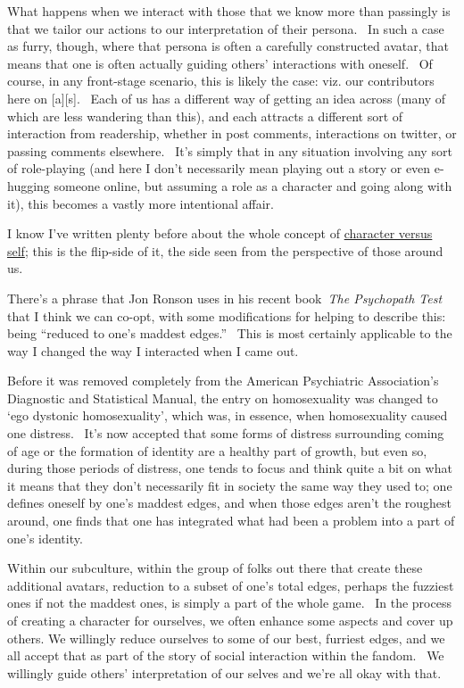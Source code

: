 What happens when we interact with those that we know more than
passingly is that we tailor our actions to our interpretation of their
persona. ~In such a case as furry, though, where that persona is often a
carefully constructed avatar, that means that one is often actually
guiding others' interactions with oneself. ~Of course, in any
front-stage scenario, this is likely the case: viz. our contributors
here on {[}a{]}{[}s{]}. ~Each of us has a different way of getting an
idea across (many of which are less wandering than this), and each
attracts a different sort of interaction from readership, whether in
post comments, interactions on twitter, or passing comments elsewhere.
~It's simply that in any situation involving any sort of role-playing
(and here I don't necessarily mean playing out a story or even e-hugging
someone online, but assuming a role as a character and going along with
it), this becomes a vastly more intentional affair.

I know I've written plenty before about the whole concept of
\href{http://adjectivespecies.com/2011/11/23/character-versus-self/}{character
versus self}; this is the flip-side of it, the side seen from the
perspective of those around us.

There's a phrase that Jon Ronson uses in his recent book~\emph{The
Psychopath Test} that I think we can co-opt, with some modifications for
helping to describe this: being ``reduced to one's maddest edges.''
~This is most certainly applicable to the way I changed the way I
interacted when I came out.

Before it was removed completely from the American Psychiatric
Association's Diagnostic and Statistical Manual, the entry on
homosexuality was changed to `ego dystonic homosexuality', which was, in
essence, when homosexuality caused one distress. ~It's now accepted that
some forms of distress surrounding coming of age or the formation of
identity are a healthy part of growth, but even so, during those periods
of distress, one tends to focus and think quite a bit on what it means
that they don't necessarily fit in society the same way they used to;
one defines oneself by one's maddest edges, and when those edges aren't
the roughest around, one finds that one has integrated what had been a
problem into a part of one's identity.

Within our subculture, within the group of folks out there that create
these additional avatars, reduction to a subset of one's total edges,
perhaps the fuzziest ones if not the maddest ones, is simply a part of
the whole game. ~In the process of creating a character for ourselves,
we often enhance some aspects and cover up others. We willingly reduce
ourselves to some of our best, furriest edges, and we all accept that as
part of the story of social interaction within the fandom. ~We willingly
guide others' interpretation of our selves and we're all okay with that.

